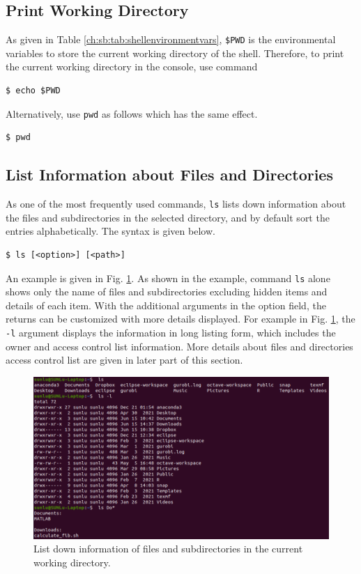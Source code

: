 \subsection{Print Working Directory}

As given in Table \ref{ch:sb:tab:shellenvironmentvars}, \verb|$PWD| is the environmental variables to store the current working directory of the shell. Therefore, to print the current working directory in the console, use command 
\begin{lstlisting}
$ echo $PWD
\end{lstlisting}
Alternatively, use \verb|pwd| as follows which has the same effect.
\begin{lstlisting}
$ pwd
\end{lstlisting}

\subsection{List Information about Files and Directories}

As one of the most frequently used commands, \verb|ls| lists down information about the files and subdirectories in the selected directory, and by default sort the entries alphabetically. The syntax is given below.
\begin{lstlisting}
$ ls [<option>] [<path>]
\end{lstlisting}

An example is given in Fig. \ref{ch:fm:fig:lscommandexample}. As shown in the example, command \verb|ls| alone shows only the name of files and subdirectories excluding hidden items and details of each item. With the additional arguments in the option field, the returns can be customized with more details displayed. For example in Fig. \ref{ch:fm:fig:lscommandexample}, the \verb|-l| argument displays the information in long listing form, which includes the owner and access control list information. More details about files and directories access control list are given in later part of this section.

\begin{figure}[htbp]
	\centering
	\includegraphics[width=350pt]{chapters/part-1/figures/ls_command_example.png}
	\caption{List down information of files and subdirectories in the current working directory.} \label{ch:fm:fig:lscommandexample}
\end{figure}

